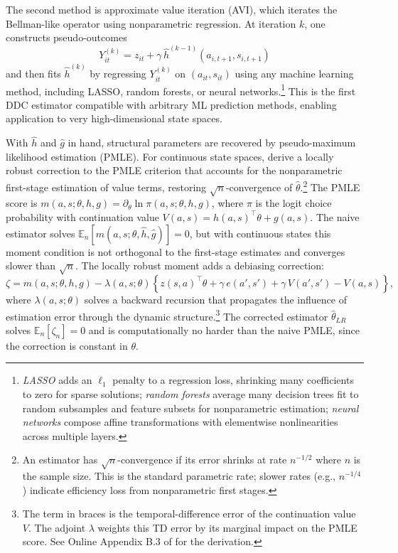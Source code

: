 The second method is approximate value iteration (AVI), which iterates the Bellman-like operator using nonparametric regression. At iteration $k$, one constructs pseudo-outcomes
\begin{equation}
Y_{it}^{(k)} = z_{it} + \gamma \, \hat{h}^{(k-1)}(a_{i,t+1}, s_{i,t+1})
\end{equation}
and then fits $\hat{h}^{(k)}$ by regressing $Y_{it}^{(k)}$ on $(a_{it}, s_{it})$ using any machine learning method, including LASSO, random forests, or neural networks.\footnote{\emph{LASSO} \citep{Tibshirani1996} adds an $\ell_1$ penalty to a regression loss, shrinking many coefficients to zero for sparse solutions; \emph{random forests} average many decision trees fit to random subsamples and feature subsets for nonparametric estimation; \emph{neural networks} compose affine transformations with elementwise nonlinearities across multiple layers.} This is the first DDC estimator compatible with arbitrary ML prediction methods, enabling application to very high-dimensional state spaces.

With $\hat{h}$ and $\hat{g}$ in hand, structural parameters are recovered by pseudo-maximum likelihood estimation (PMLE). For continuous state spaces, \citet{AdusumilliEckardt2022} derive a locally robust correction to the PMLE criterion that accounts for the nonparametric first-stage estimation of value terms, restoring $\sqrt{n}$-convergence of $\hat{\theta}$.\footnote{An estimator has $\sqrt{n}$-convergence if its error shrinks at rate $n^{-1/2}$ where $n$ is the sample size. This is the standard parametric rate; slower rates (e.g., $n^{-1/4}$) indicate efficiency loss from nonparametric first stages.} The PMLE score is $m(a,s;\theta,h,g) = \partial_\theta \ln \pi(a,s;\theta,h,g)$, where $\pi$ is the logit choice probability with continuation value $V(a,s) = h(a,s)^\top \theta + g(a,s)$. The naive estimator solves $\mathbb{E}_n[m(a,s;\theta,\hat{h},\hat{g})] = 0$, but with continuous states this moment condition is not orthogonal to the first-stage estimates and converges slower than $\sqrt{n}$. The locally robust moment adds a debiasing correction:
\begin{equation}
\zeta = m(a,s;\theta,h,g) - \lambda(a,s;\theta)\left\{z(s,a)^\top \theta + \gamma \, e(a',s') + \gamma \, V(a',s') - V(a,s)\right\},
\label{eq:ae_robust}
\end{equation}
where $\lambda(a,s;\theta)$ solves a backward recursion that propagates the influence of estimation error through the dynamic structure.\footnote{The term in braces is the temporal-difference error of the continuation value $V$. The adjoint $\lambda$ weights this TD error by its marginal impact on the PMLE score. See Online Appendix B.3 of \citet{AdusumilliEckardt2022} for the derivation.} The corrected estimator $\hat{\theta}_{LR}$ solves $\mathbb{E}_n[\zeta_n] = 0$ and is computationally no harder than the naive PMLE, since the correction is constant in $\theta$.

